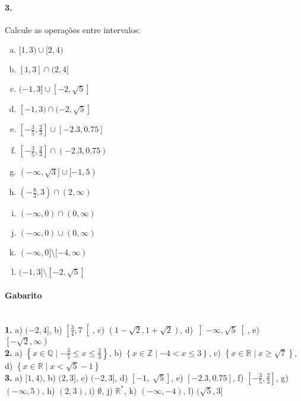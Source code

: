 \documentclass[a4paper,twocolumn,12pt]{article}
\begin{document}
\paragraph*{3. } Calcule as operações entre intervalos:
\begin{enumerate}[a)]
\item $[1, 3) \cup [2, 4)$
\item $[1, 3] \cap (2, 4]$
\item $(-1, 3] \cup  [-2, \sqrt{5}]$
\item $[-1, 3) \cap  (-2, \sqrt{5}]$
\item $\left[-\frac{3}{5},\frac{2}{3}\right] \cup [-2.3,0.75]$
\item $\left[-\frac{3}{5},\frac{2}{3}\right] \cap (-2.3,0.75)$
\item $(-\infty, \sqrt{3}] \cup [-1, 5)$
\item $\left(-\frac{8}{3},3\right)\cap (2,\infty)$
\item $(-\infty, 0) \cap (0, \infty)$
\item $(-\infty, 0) \cup (0, \infty)$
\item $(-\infty, 0] \setminus [-4, \infty)$
\item $(-1, 3] \setminus  [-2, \sqrt{5}]$
\end{enumerate}


 \vfill
{\footnotesize\color{darkgray}
  \paragraph*{Gabarito} \hspace*{\fill}\\
\textbf{1.} a) $(-2,4]$, b) $\left[\frac{3}{4},7\right[$, c) $\left(1-\sqrt{2},1+\sqrt{2}\right)$, d) $\left]-\infty,\sqrt{5}\right[$, e) $\left[-\sqrt{2},\infty\right)$\\
\textbf{2.} a) $\left\{x \in \mathbb{Q} \mid -\frac{3}{5} \leq x \leq \frac{2}{3}\right\}$, b) $\left\{x \in \mathbb{Z} \mid -4 < x \leq 3\right\}$, c) $\left\{x \in \mathbb{R} \mid x \geq \sqrt{7}\right\}$, d) $\left\{x \in \mathbb{R} \mid x < \sqrt{5}-1\right\}$\\
\textbf{3.} a) $[1,4)$, b) $(2,3]$, c) $(-2,3]$, d) $[-1,\sqrt[]{5}]$, e) $\left[-2.3,0.75\right]$, f) $\left[-\frac{3}{5},\frac{2}{3}\right]$, g) $(-\infty,5)$, h) $(2,3)$, i) $\emptyset$, j) $\mathbb{R}^*$, k) $(-\infty,-4)$, l) $(\sqrt{5},3]$
}
\end{document}
